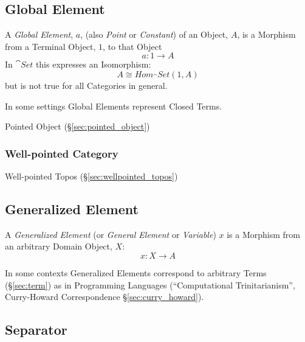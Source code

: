 \subsection{Global Element}\label{sec:global_element}

A \emph{Global Element}, $a$, (also \emph{Point} or \emph{Constant})
of an Object, $A$, is a Morphism from a Terminal Object, $1$, to that
Object
\[
  a: 1 \rightarrow A
\]
In $\cat{Set}$ this expresses an Isomorphism:
\[
  A \cong Hom_\cat{Set}(1,A)
\]
but is not true for all Categories in general.

In some settings Global Elements represent Closed Terms.

Pointed Object (\S\ref{sec:pointed_object})



\subsubsection{Well-pointed Category}\label{sec:well_pointed}

Well-pointed Topos (\S\ref{sec:wellpointed_topos})



\subsection{Generalized Element}\label{sec:generalized_element}

A \emph{Generalized Element} (or \emph{General Element} or
\emph{Variable}) $x$ is a Morphism from an arbitrary Domain Object,
$X$:
\[
  x: X \rightarrow A
\]

In some contexts Generalized Elements correspond to arbitrary Terms
(\S\ref{sec:term}) as in Programming Languages (``Computational
Trinitarianism'', Curry-Howard Correspondence
\S\ref{sec:curry_howard}).



\subsection{Separator}\label{sec:separator}

